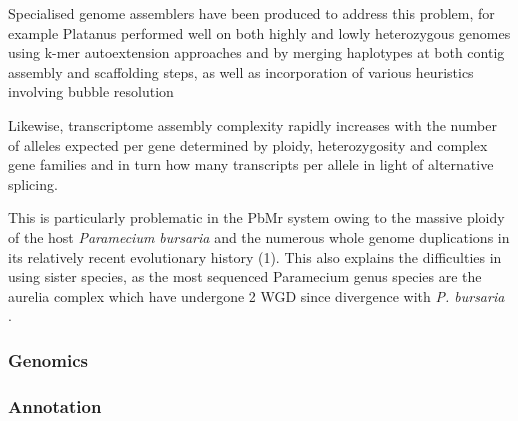 Specialised genome assemblers have been produced to address this problem,
for example Platanus performed well on both highly and lowly heterozygous 
genomes using k-mer autoextension approaches and by merging haplotypes
at both contig assembly and scaffolding steps, as well as incorporation
of various heuristics involving bubble resolution \citep{Bradnam2013,Katjitani2014}

Likewise, transcriptome assembly complexity rapidly increases with the number of alleles
expected per gene determined by ploidy, heterozygosity and complex gene families
and in turn how many transcripts per allele in light of alternative splicing.

This is particularly problematic in the PbMr system owing to the massive
ploidy of the host \textit{Paramecium bursaria} and the numerous whole genome
duplications in its relatively recent evolutionary history (1).  This also 
explains the difficulties in using sister species, as the most sequenced Paramecium
genus species are the aurelia complex which have undergone 2 WGD since divergence with
\textit{P. bursaria} \citep{McGrath2014}.



\subsubsection{Genomics}




\subsubsection{Annotation}

